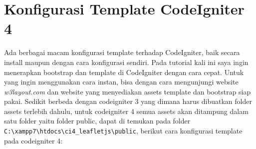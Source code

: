 \section{Konfigurasi Template CodeIgniter 4}
Ada berbagai macam konfigurasi template terhadap CodeIgniter, baik secara install maupun dengan cara konfigurasi sendiri. Pada tutorial kali ini saya ingin menerapkan bootstrap dan template di CodeIgniter dengan cara cepat. Untuk yang ingin menggunakan cara instan, bisa dengan cara mengunjungi website \textit{w3layout.com} dan website yang menyediakan assets template dan bootstrap siap pakai. Sedikit berbeda dengan codeigniter 3 yang dimana harus dibuatkan folder assets terlebih dahulu, untuk codeigniter 4 semua assets akan ditampung dalam satu folder yaitu folder public, dapat di temukan pada folder \verb|C:\xampp7\htdocs\ci4_leafletjs\public|, berikut cara konfigurasi template pada codeigniter 4:
